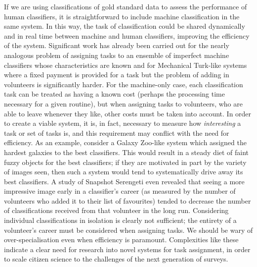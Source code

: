 \documentclass{ar2e}
\begin{document}
If we are using classifications of gold standard data to assess the performance
of human classifiers, it is straightforward to include machine classification in
the same system. In this way, the task of classification could be shared
dynamically and in real time between machine and human classifiers, improving
the efficiency of the system. Significant work has already been carried out for
the nearly analogous problem of assigning tasks to an ensemble of imperfect
machine classifiers whose characteristics are known 
and for
Mechanical Turk-like systems where a fixed payment is provided for a task but
the problem of adding in volunteers is significantly harder.
For the machine-only case, each classification task can be treated as having a
known cost (perhaps the processing time necessary for a given routine), but when
assigning tasks to  volunteers, who are able to leave whenever they like, other
costs must be taken into account. In order to create a viable system, it is, in
fact, necessary to measure how {\it interesting} 
a task or set of tasks is, and this
requirement may conflict with the need for efficiency. As an example, consider a
Galaxy Zoo-like system which assigned the hardest galaxies to the best
classifiers. This would result in a steady diet of faint fuzzy objects for the
best classifiers; if they are motivated in part by the variety of images seen,
then such a system would tend to systematically drive away its best classifiers.
A study of Snapshot Serengeti even revealed that seeing a more impressive image
early in a classifier's career (as measured by the number of volunteers who
added it to their list of favourites) tended to decrease the number of
classifications received from that volunteer in the long run. Considering
individual classifications in isolation is clearly not sufficient; the entirety
of a volunteer's career must be considered when assigning tasks. We should be
wary of over-specialisation even when efficiency is paramount. Complexities like
these indicate a clear need for research into novel systems for task assignment,
in order to scale citizen science to the challenges of the next generation of
surveys. 




\end{document}
